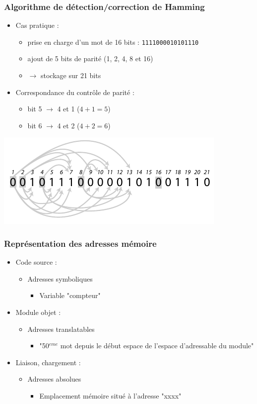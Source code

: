 \begin{frame}
\frametitle{Algorithme de détection/correction de Hamming}
\begin{itemize}
\item Cas pratique \cite{tanen} :
\begin{itemize}
\item prise en charge d'un mot de 16 bits : \texttt{1111000010101110}
\item ajout de 5 bits de parité (1, 2, 4, 8 et 16)
\item $\rightarrow$ stockage sur 21 bits
\end{itemize}
\item Correspondance du contrôle de parité :
\begin{itemize}
\item bit 5 $\rightarrow$ 4 et 1 ($4+1=5$)
\item bit 6 $\rightarrow$ 4 et 2 ($4+2=6$)
\end{itemize}
\end{itemize}

\includegraphics{../illustration/hamming_exemple.pdf}
\end{frame}


\begin{frame}
\frametitle{Représentation des adresses mémoire}
\begin{itemize}
\item Code source :
\begin{itemize}
\item Adresses symboliques
\begin{itemize}
\item Variable "compteur"
\end{itemize}
\end{itemize}
\item <2->Module objet :
\begin{itemize}
\item Adresses translatables
\begin{itemize}
\item "50$^{eme}$ mot depuis le début espace de l'espace d'adressable du module"
\end{itemize}
\end{itemize}
\item <3->Liaison, chargement :
\begin{itemize}
\item Adresses absolues
\begin{itemize}
\item Emplacement mémoire situé à l’adresse "xxxx"
\end{itemize}
\end{itemize}
\end{itemize}
\end{frame}


